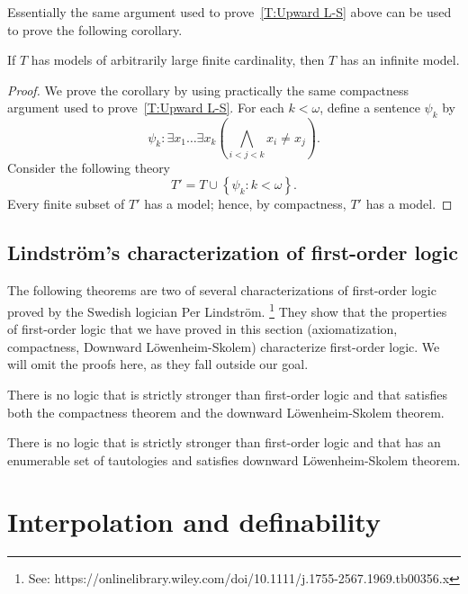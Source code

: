 \documentclass{scrartcl}
\begin{document}
Essentially the same argument used to prove~\ref{T:Upward L-S} above can be used to prove the following corollary.  

\begin{corollary}
\label{T:Upward L-S}
If $T$ has models of arbitrarily large finite cardinality, then $T$ has an infinite model.
\end{corollary}

\begin{proof}
We prove the corollary by using practically the same compactness argument used to prove~\ref{T:Upward L-S}. For each $k<\omega$, define a sentence $\psi_k$ by
\[
\psi_k : \exists x_1 \dots \exists x_k (\bigwedge_{i<j<k} x_i\neq x_j ).
\]
Consider the following theory
\[
T'= T\cup\left\{ \psi_k \colon k<\omega \right\}.
\]
Every finite subset of $T'$ has a model; hence, by compactness, $T'$ has a model.
\end{proof}

\subsection{Lindström's characterization of first-order logic}

The following theorems are two of several characterizations of first-order logic proved by the Swedish logician Per Lindström.%
\footnote{See: https://onlinelibrary.wiley.com/doi/10.1111/j.1755-2567.1969.tb00356.x}
They show that the properties of first-order logic that we have proved in this section (axiomatization, compactness, Downward Löwenheim-Skolem) characterize first-order logic.
We will omit the proofs here, as they fall outside our goal. 

\begin{theorem}
There is no logic that is strictly stronger than first-order logic and that satisfies both the compactness theorem and the downward Löwenheim-Skolem theorem.
\end{theorem}

\begin{theorem}
There is no logic that is strictly stronger than first-order logic and that has an enumerable set of tautologies and satisfies downward Löwenheim-Skolem theorem.
\end{theorem}



\section{Interpolation and definability}
\end{document}
